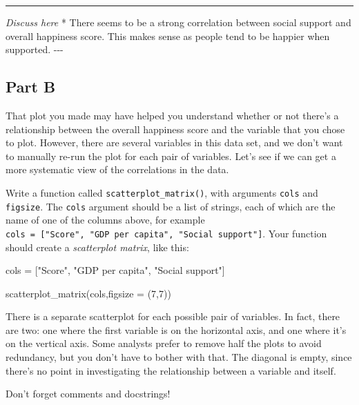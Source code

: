 \documentclass[11pt]{article}
\newenvironment{Shaded}{}{}
\newcommand{\DecValTok}[1]{\textcolor[rgb]{0.25,0.63,0.44}{{#1}}}
\newcommand{\StringTok}[1]{\textcolor[rgb]{0.25,0.44,0.63}{{#1}}}
\newcommand{\NormalTok}[1]{{#1}}
\newcommand{\OperatorTok}[1]{\textcolor[rgb]{0.40,0.40,0.40}{{#1}}}
\begin{document}
    \begin{center}\rule{0.5\linewidth}{\linethickness}\end{center}

\emph{Discuss here} * There seems to be a strong correlation between
social support and overall happiness score. This makes sense as people
tend to be happier when supported. -\/-\/-

    \subsection{Part B}\label{part-b}

That plot you made may have helped you understand whether or not there's
a relationship between the overall happiness score and the variable that
you chose to plot. However, there are several variables in this data
set, and we don't want to manually re-run the plot for each pair of
variables. Let's see if we can get a more systematic view of the
correlations in the data.

Write a function called \texttt{scatterplot\_matrix()}, with arguments
\texttt{cols} and \texttt{figsize}. The \texttt{cols} argument should be
a list of strings, each of which are the name of one of the columns
above, for example
\texttt{cols\ =\ {[}"Score",\ "GDP\ per\ capita",\ "Social\ support"{]}}.
Your function should create a \emph{scatterplot matrix}, like this:

\begin{Shaded}
\begin{Highlighting}[]
\NormalTok{cols }\OperatorTok{=}\NormalTok{ [}\StringTok{"Score"}\NormalTok{, }
        \StringTok{"GDP per capita"}\NormalTok{, }
        \StringTok{"Social support"}\NormalTok{]}
           
\NormalTok{scatterplot_matrix(cols,figsize }\OperatorTok{=}\NormalTok{ (}\DecValTok{7}\NormalTok{,}\DecValTok{7}\NormalTok{))}
\end{Highlighting}
\end{Shaded}

There is a separate scatterplot for each possible pair of variables. In
fact, there are two: one where the first variable is on the horizontal
axis, and one where it's on the vertical axis. Some analysts prefer to
remove half the plots to avoid redundancy, but you don't have to bother
with that. The diagonal is empty, since there's no point in
investigating the relationship between a variable and itself.

Don't forget comments and docstrings!
\end{document}
